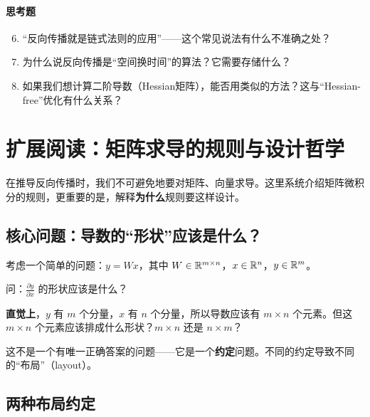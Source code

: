 \paragraph{思考题}
\begin{enumerate}
    \setcounter{enumi}{5}
    \item ``反向传播就是链式法则的应用''——这个常见说法有什么不准确之处？
    
    \item 为什么说反向传播是``空间换时间''的算法？它需要存储什么？
    
    \item 如果我们想计算二阶导数（Hessian矩阵），能否用类似的方法？这与``Hessian-free''优化有什么关系？
\end{enumerate}

\section*{扩展阅读：矩阵求导的规则与设计哲学}

在推导反向传播时，我们不可避免地要对矩阵、向量求导。这里系统介绍矩阵微积分的规则，更重要的是，解释\textbf{为什么}规则要这样设计。

\subsection*{核心问题：导数的``形状''应该是什么？}

考虑一个简单的问题：$y = Wx$，其中 $W \in \mathbb{R}^{m \times n}$，$x \in \mathbb{R}^n$，$y \in \mathbb{R}^m$。

问：$\frac{\partial y}{\partial x}$ 的形状应该是什么？

\textbf{直觉上}，$y$ 有 $m$ 个分量，$x$ 有 $n$ 个分量，所以导数应该有 $m \times n$ 个元素。但这 $m \times n$ 个元素应该排成什么形状？$m \times n$ 还是 $n \times m$？

这不是一个有唯一正确答案的问题——它是一个\textbf{约定}问题。不同的约定导致不同的``布局''（layout）。

\subsection*{两种布局约定}

